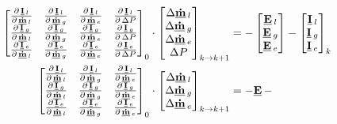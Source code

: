 \begin{align}
\begin{bmatrix} 
\DerivParOne{\vec{I}_{l}}{\vec{\dot{m}}_{l}} & \DerivParOne{\vec{I}_{l}}{\vec{\dot{m}}_{g}}  & \DerivParOne{\vec{I}_{l}}{\vec{\dot{m}}_{e}} & \DerivParOne{\vec{I}_{l}}{\Delta P}\\
\DerivParOne{\vec{I}_{g}}{\vec{\dot{m}}_{l}} & \DerivParOne{\vec{I}_{g}}{\vec{\dot{m}}_{g}}  & \DerivParOne{\vec{I}_{g}}{\vec{\dot{m}}_{e}} & \DerivParOne{\vec{I}_{g}}{\Delta P}\\
\DerivParOne{\vec{I}_{e}}{\vec{\dot{m}}_{l}} & \DerivParOne{\vec{I}_{e}}{\vec{\dot{m}}_{g}}  & \DerivParOne{\vec{I}_{e}}{\vec{\dot{m}}_{e}} & \DerivParOne{\vec{I}_{e}}{\Delta P}
\end{bmatrix}_{0}
\cdot
\begin{bmatrix}
\Delta \vec{\dot{m}}_l \\
\Delta \vec{\dot{m}}_g \\
\Delta \vec{\dot{m}}_e \\
\Delta P
\end{bmatrix}_{k\rightarrow k+1} & =
-\begin{bmatrix}
\vec{E}_{l} \\
\vec{E}_{g} \\
\vec{E}_{e}
\end{bmatrix} -
\begin{bmatrix}
\vec{I}_{l} \\
\vec{I}_{g} \\
\vec{I}_{e}
\end{bmatrix}_{k} \\ 
\begin{bmatrix} 
\DerivParOne{\vec{I}_{l}}{\vec{\dot{m}}_{l}} & \DerivParOne{\vec{I}_{l}}{\vec{\dot{m}}_{g}}  & \DerivParOne{\vec{I}_{l}}{\vec{\dot{m}}_{e}} \\
\DerivParOne{\vec{I}_{g}}{\vec{\dot{m}}_{l}} & \DerivParOne{\vec{I}_{g}}{\vec{\dot{m}}_{g}}  & \DerivParOne{\vec{I}_{g}}{\vec{\dot{m}}_{e}} \\
\DerivParOne{\vec{I}_{e}}{\vec{\dot{m}}_{l}} & \DerivParOne{\vec{I}_{e}}{\vec{\dot{m}}_{g}}  & \DerivParOne{\vec{I}_{e}}{\vec{\dot{m}}_{e}}
\end{bmatrix}_{0}
\cdot
\begin{bmatrix}
\Delta \vec{\dot{m}}_l \\
\Delta \vec{\dot{m}}_g \\
\Delta \vec{\dot{m}}_e
\end{bmatrix}_{k\rightarrow k+1} & =
-\vec{E} -

\end{align}

